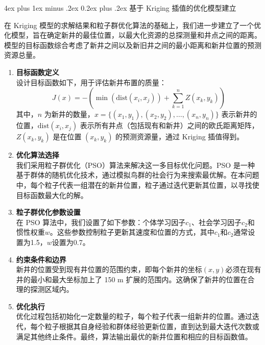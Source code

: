 \documentclass[12pt,a4paper]{nmmcm}
\makeatletter
\renewcommand\subsubsection{\@startsection{subsubsection}{3}{1em}%
  {4ex plus 1ex minus .2ex}%
  {0.2ex plus .2ex}%
  {\normalfont\large\bfseries}}
\makeatother
\begin{document}
\subsubsection{基于 Kriging 插值的优化模型建立}

在 Kriging 模型的求解结果和粒子群优化算法的基础上，我们进一步建立了一个优化模型，旨在确定新井的最佳位置，以最大化资源的总探测量和井点之间的距离。模型的目标函数综合考虑了新井之间以及新旧井之间的最小距离和新井位置的预测资源总量。

\begin{enumerate}
  \item \textbf{目标函数定义} \\
        设计目标函数如下，用于评估新井布置的质量：
        \[
          J(x) = -\left(\min(\text{dist}(x_i, x_j)) + \sum_{k=1}^{n} Z(x_k, y_k)\right)
        \]
        其中，$n$ 为新井的数量，$x = \{(x_1, y_1), (x_2, y_2), \ldots, (x_{n}, y_{n})\}$ 表示新井的位置，$\text{dist}(x_i, x_j)$ 表示所有井点（包括现有和新井）之间的欧氏距离矩阵，$Z(x_k, y_k)$ 是在位置 $(x_k, y_k)$ 的预测资源量，通过 Kriging 插值得到。

  \item \textbf{优化算法选择} \\
        我们采用粒子群优化（PSO）算法来解决这一多目标优化问题。PSO 是一种基于群体的随机优化技术，通过模拟鸟群的社会行为来搜索最优解。在本问题中，每个粒子代表一组潜在的新井位置，粒子通过迭代更新其位置，以寻找使目标函数最大化的解。

  \item \textbf{粒子群优化参数设置} \\
        在 PSO 算法中，我们设置了如下参数：个体学习因子$c_1$、社会学习因子$c_2$和惯性权重$w$。这些参数控制粒子更新其速度和位置的方式，其中$c_1$和$c_2$通常设置为1.5，$w$设置为0.7。

  \item \textbf{约束条件和边界} \\
        新井的位置受到现有井位置的范围约束，即每个新井的坐标$(x, y)$必须在现有井的最小和最大坐标加上了 150 m 扩展的范围内。这确保了新井的位置在合理的探测区域内。

  \item \textbf{优化执行} \\
        优化过程包括初始化一定数量的粒子，每个粒子代表一组新井的位置。通过迭代，每个粒子根据其自身经验和群体经验更新位置，直到达到最大迭代次数或满足其他终止条件。最终，算法输出最优的新井位置和相应的目标函数值。
\end{enumerate}
\end{document}
